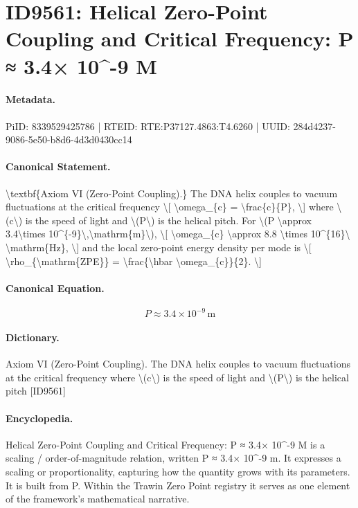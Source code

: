 \section*{ID9561: Helical Zero-Point Coupling and Critical Frequency: P ≈ 3.4× 10\textasciicircum{}-9 M}
\paragraph{Metadata.}
PiID: 8339529425786 | RTEID: RTE:P37127.4863:T4.6260 | UUID: 284d4237-9086-5e50-b8d6-4d3d0430cc14

\paragraph{Canonical Statement.}
\textbackslash{}textbf\{Axiom VI (Zero-Point Coupling).\} The DNA helix couples to vacuum fluctuations at the critical frequency \textbackslash{}[ \textbackslash{}omega\_\{c\} = \textbackslash{}frac\{c\}\{P\}, \textbackslash{}] where \textbackslash{}(c\textbackslash{}) is the speed of light and \textbackslash{}(P\textbackslash{}) is the helical pitch. For \textbackslash{}(P \textbackslash{}approx 3.4\textbackslash{}times 10\textasciicircum{}\{-9\}\textbackslash{},\textbackslash{}mathrm\{m\}\textbackslash{}), \textbackslash{}[ \textbackslash{}omega\_\{c\} \textbackslash{}approx 8.8 \textbackslash{}times 10\textasciicircum{}\{16\}\textbackslash{} \textbackslash{}mathrm\{Hz\}, \textbackslash{}] and the local zero-point energy density per mode is \textbackslash{}[ \textbackslash{}rho\_\{\textbackslash{}mathrm\{ZPE\}\} = \textbackslash{}frac\{\textbackslash{}hbar \textbackslash{}omega\_\{c\}\}\{2\}. \textbackslash{}]

\paragraph{Canonical Equation.}
\[
P \approx 3.4\times 10^{-9}\,\mathrm{m}
\]

\paragraph{Dictionary.}
Axiom VI (Zero-Point Coupling). The DNA helix couples to vacuum fluctuations at the critical frequency where \textbackslash{}(c\textbackslash{}) is the speed of light and \textbackslash{}(P\textbackslash{}) is the helical pitch [ID9561]

\paragraph{Encyclopedia.}
Helical Zero-Point Coupling and Critical Frequency: P ≈ 3.4× 10\textasciicircum{}-9 M is a scaling / order-of-magnitude relation, written P ≈ 3.4× 10\textasciicircum{}-9 m. It expresses a scaling or proportionality, capturing how the quantity grows with its parameters. It is built from P. Within the Trawin Zero Point registry it serves as one element of the framework's mathematical narrative.
